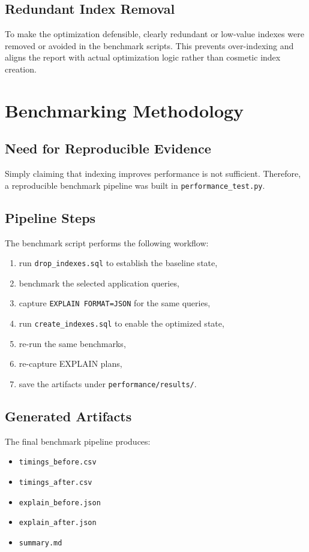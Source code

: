 \documentclass[12pt,a4paper]{article}
\begin{document}
\subsection{Redundant Index Removal}
To make the optimization defensible, clearly redundant or low-value indexes were removed or avoided in the benchmark scripts. This prevents over-indexing and aligns the report with actual optimization logic rather than cosmetic index creation.

\section{Benchmarking Methodology}
\subsection{Need for Reproducible Evidence}
Simply claiming that indexing improves performance is not sufficient. Therefore, a reproducible benchmark pipeline was built in \texttt{performance\_test.py}.

\subsection{Pipeline Steps}
The benchmark script performs the following workflow:
\begin{enumerate}[leftmargin=1.8em]
    \item run \texttt{drop\_indexes.sql} to establish the baseline state,
    \item benchmark the selected application queries,
    \item capture \texttt{EXPLAIN FORMAT=JSON} for the same queries,
    \item run \texttt{create\_indexes.sql} to enable the optimized state,
    \item re-run the same benchmarks,
    \item re-capture EXPLAIN plans,
    \item save the artifacts under \texttt{performance/results/}.
\end{enumerate}

\subsection{Generated Artifacts}
The final benchmark pipeline produces:
\begin{itemize}[leftmargin=1.5em]
    \item \texttt{timings\_before.csv}
    \item \texttt{timings\_after.csv}
    \item \texttt{explain\_before.json}
    \item \texttt{explain\_after.json}
    \item \texttt{summary.md}
\end{itemize}
\end{document}
